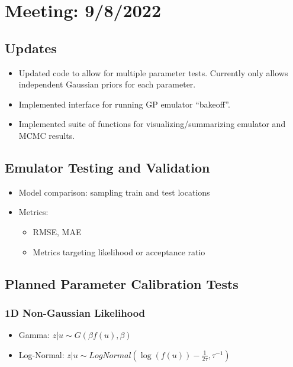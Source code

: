 \documentclass[12pt]{article}
\begin{document}
\section{Meeting: 9/8/2022}
\subsection{Updates}
\begin{itemize}
\item Updated code to allow for multiple parameter tests. Currently only allows independent Gaussian priors for each parameter. 
\item Implemented interface for running GP emulator ``bakeoff''. 
\item Implemented suite of functions for visualizing/summarizing emulator and MCMC results. 
\end{itemize}

\subsection{Emulator Testing and Validation}
\begin{itemize}
\item Model comparison: sampling train and test locations
\item Metrics:
	\begin{itemize}
	\item RMSE, MAE
	\item Metrics targeting likelihood or acceptance ratio
	\end{itemize}
\end{itemize}

\subsection{Planned Parameter Calibration Tests}
\subsubsection{1D Non-Gaussian Likelihood}
\begin{itemize}
\item Gamma: $z|u \sim G(\beta f(u), \beta)$
\item Log-Normal: $z|u \sim LogNormal\left(\log(f(u)) - \frac{1}{2\tau}, \tau^{-1}\right)$
\end{itemize}
\end{document}
